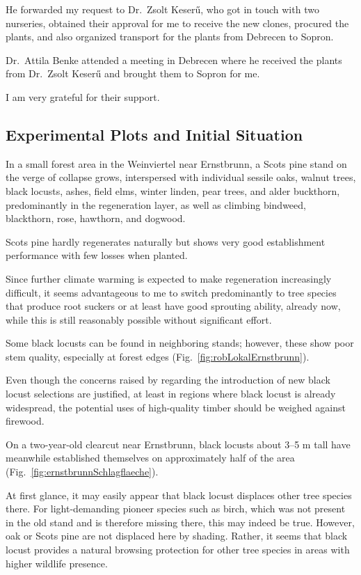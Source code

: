 He forwarded my request to Dr.~Zsolt Keserű, who got in touch with two nurseries, obtained their approval for me to receive the new clones, procured the plants, and also organized transport for the plants from Debrecen to Sopron.

Dr.~Attila Benke attended a meeting in Debrecen where he received the plants from Dr.~Zsolt Keserű and brought them to Sopron for me.

I am very grateful for their support.

\subsection{Experimental Plots and Initial Situation}

In a small forest area in the Weinviertel near Ernstbrunn, a Scots pine stand on the verge of collapse grows, interspersed with individual sessile oaks, walnut trees, black locusts, ashes, field elms, winter linden, pear trees, and alder buckthorn, predominantly in the regeneration layer, as well as climbing bindweed, blackthorn, rose, hawthorn, and dogwood.

Scots pine hardly regenerates naturally but shows very good establishment performance with few losses when planted.

Since further climate warming is expected to make regeneration increasingly difficult, it seems advantageous to me to switch predominantly to tree species that produce root suckers or at least have good sprouting ability, already now, while this is still reasonably possible without significant effort.

Some black locusts can be found in neighboring stands; however, these show poor stem quality, especially at forest edges (Fig.~\ref{fig:robLokalErnstbrunn}).


Even though the concerns raised by \citet{bouteiller2019robinie} regarding the introduction of new black locust selections are justified, at least in regions where black locust is already widespread, the potential uses of high-quality timber should be weighed against firewood.

On a two-year-old clearcut near Ernstbrunn, black locusts about 3–5 m tall have meanwhile established themselves on approximately half of the area (Fig.~\ref{fig:ernstbrunnSchlagflaeche}).


At first glance, it may easily appear that black locust displaces other tree species there. For light-demanding pioneer species such as birch, which was not present in the old stand and is therefore missing there, this may indeed be true. However, oak or Scots pine are not displaced here by shading. Rather, it seems that black locust provides a natural browsing protection for other tree species in areas with higher wildlife presence.


